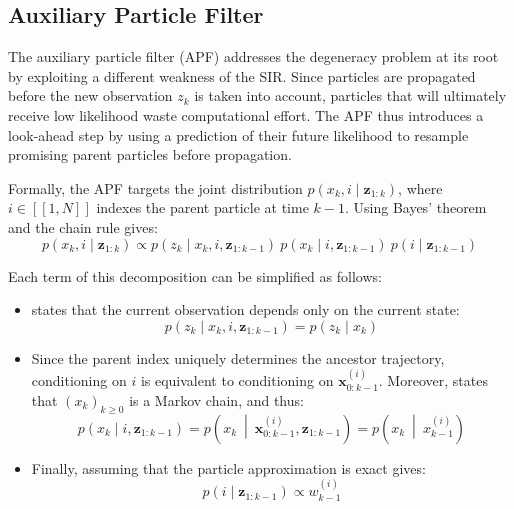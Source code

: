\subsection{Auxiliary Particle Filter}

The auxiliary particle filter (APF) \cite{bib:APF,bib:APF-optimality} addresses the degeneracy problem at its root by exploiting a different weakness of the SIR. Since particles are propagated before the new observation $z_k$ is taken into account, particles that will ultimately receive low likelihood waste computational effort. The APF thus introduces a look-ahead step by using a prediction of their future likelihood to resample promising parent particles before propagation.

Formally, the APF targets the joint distribution $p(x_k,i\mid\mathbf{z}_{1:k})$, where $i\in[\![1,N]\!]$ indexes the parent particle at time $k-1$. Using Bayes' theorem and the chain rule gives:
\begin{equation}
	p(x_k,i\mid\mathbf{z}_{1:k})\propto p(z_k\mid x_k,i,\mathbf{z}_{1:k-1})\:p(x_k\mid i,\mathbf{z}_{1:k-1})\:p(i\mid\mathbf{z}_{1:k-1})\label{eq:joint_distribution_APF}
\end{equation}

Each term of this decomposition can be simplified as follows:
\begin{itemize}
	\item{} states that the current observation depends only on the current state:
	\begin{equation}
		p(z_k\mid x_k,i,\mathbf{z}_{1:k-1})=p(z_k\mid x_k)
	\end{equation}
	\item Since the parent index uniquely determines the ancestor trajectory, conditioning on $i$ is equivalent to conditioning on $\mathbf{x}_{0:k-1}^{(i)}$. Moreover,  states that $(x_k)_{k\geq0}$ is a Markov chain, and thus:
	\begin{equation}
		p(x_k\mid i,\mathbf{z}_{1:k-1})=p\left(x_k\:\middle|\:\mathbf{x}_{0:k-1}^{(i)},\mathbf{z}_{1:k-1}\right)=p\left(x_k\:\middle|\:x_{k-1}^{(i)}\right)
	\end{equation}
	\item Finally, assuming that the particle approximation is exact gives:
	\begin{equation}
		p(i\mid\mathbf{z}_{1:k-1})\propto w_{k-1}^{(i)}
	\end{equation}
\end{itemize}

